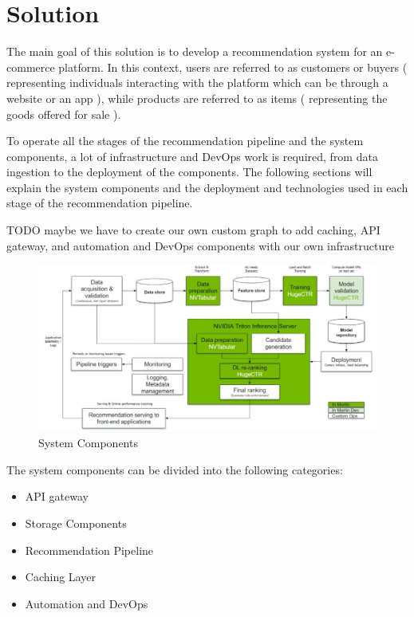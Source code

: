 \chapter{Solution}
\minitoc

The main goal of this solution is to develop a recommendation system for an e-commerce platform. 
In this context, users are referred to as customers or buyers ( representing individuals interacting with the platform which can be through a website or an app ), 
while products are referred to as items ( representing the goods offered for sale ).

To operate all the stages of the recommendation pipeline and the system components, 
a lot of infrastructure and DevOps work is required, from data ingestion to the deployment of the components.
The following sections will explain the system components and the deployment and technologies used in each stage of the recommendation pipeline.

TODO maybe we have to create our own custom graph to add caching, API gateway, and automation and DevOps components with our own infrastructure 

\begin{figure}[H]
    \centering
    \includegraphics[width=1\textwidth]{assets/components.jpeg}
    \caption[System Components]{System Components \cite{NvidiaRecSysBestPractices}}
\end{figure}


The system components can be divided into the following categories:
\begin{itemize}
    \item API gateway
    \item Storage Components
    \item Recommendation Pipeline
    \item Caching Layer
    \item Automation and DevOps
\end{itemize}

